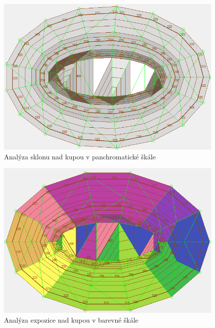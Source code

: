 \documentclass[a4paper,11pt,twoside]{article}
\begin{document}
\vspace{0.2cm}
\begin{figure}[hbt!] 
\begin{center}
\includegraphics[width=14cm]{pictures/hill_panchromatic_slope.PNG} 
\caption[Analýza sklonu nad kupou v panchromatické škále]{Analýza sklonu nad kupou v panchromatické škále}
\label{fig:hill_panchromatic_slope}
\end{center}
\end{figure}

\vspace{0.2cm}
\begin{figure}[hbt!] 
\begin{center}
\includegraphics[width=13cm]{pictures/hill_colorful_aspect.PNG} 
\caption[Analýza expozice nad kupou v barevné škále]{Analýza expozice nad kupou v barevné škále}
\label{fig:hill_colorful_aspect}
\end{center}
\end{figure}
\end{document}

